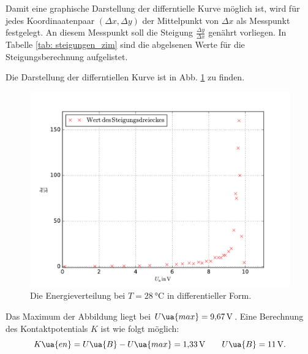Damit eine graphische Darstellung der differntielle Kurve möglich ist, wird für jedes Koordinaatenpaar $(\Delta x,\Delta y)$ der Mittelpunkt %
von $\Delta x$ als Messpunkt festgelegt. An diesem Messpunkt soll die Steigung $\frac{\Delta y}{\Delta x}$ genährt vorliegen.
In Tabelle \ref{tab: steigungen_zim} sind die abgelsenen Werte für die Steigungsberechnung aufgelistet.

Die Darstellung der differntiellen Kurve ist in Abb. \ref{fig: energie_zim_diff} zu finden.
\begin{figure}
  \centering
  \includegraphics[width=0.8 \textwidth]{../Messdaten/energie_zim.pdf}
  \caption{Die Energieverteilung bei $T=\SI{28}{\celsius}$ in differentieller Form.} %
  \label{fig: energie_zim_diff}
\end{figure}
Das Maximum der Abbildung liegt bei $U\ua{max}=\SI{9.67}{\volt}$.
Eine Berechnung des Kontaktpotentials $K$ ist wie folgt möglich:
\begin{equation}
\label{eq:k_energie_zim}
  K\ua{en}=U\ua{B}-U\ua{max}=\SI{1.33}{\volt} \qquad U\ua{B}=\SI{11}{\volt}. %
\end{equation}
\FloatBarrier %

